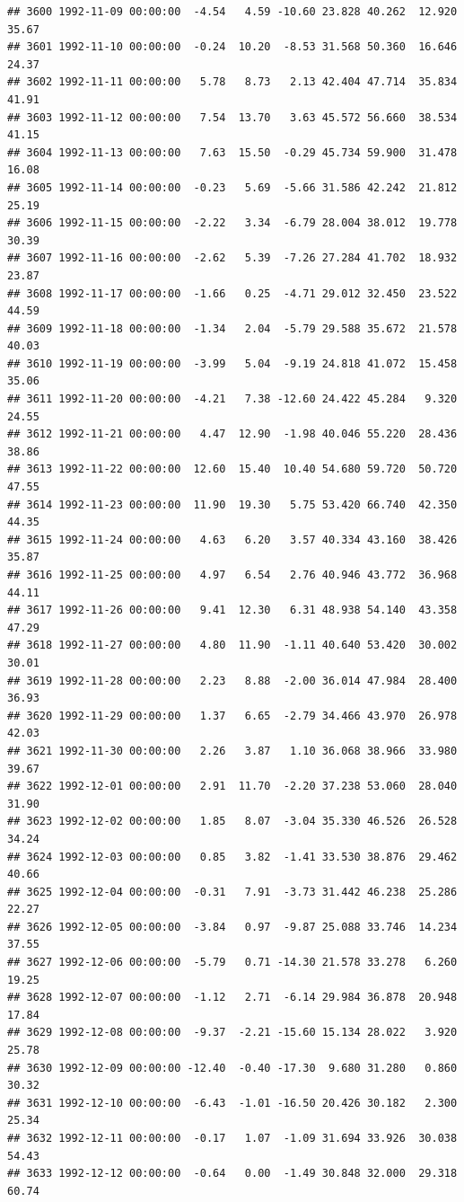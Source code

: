 \documentclass{article}\usepackage{graphicx, color}
\makeatletter
\newenvironment{kframe}{%
 \def\at@end@of@kframe{}%
 \ifinner\ifhmode%
  \def\at@end@of@kframe{\end{minipage}}%
  \begin{minipage}{\columnwidth}%
 \fi\fi%
 \def\FrameCommand##1{\hskip\@totalleftmargin \hskip-\fboxsep
 \colorbox{shadecolor}{##1}\hskip-\fboxsep
     \hskip-\linewidth \hskip-\@totalleftmargin \hskip\columnwidth}%
 \MakeFramed {\advance\hsize-\width
   \@totalleftmargin\z@ \linewidth\hsize
   \@setminipage}}%
 {\par\unskip\endMakeFramed%
 \at@end@of@kframe}
\newenvironment{knitrout}{}{} %
\makeatother
\begin{document}
\begin{knitrout}
\begin{kframe}
\begin{verbatim}
## 3600 1992-11-09 00:00:00  -4.54   4.59 -10.60 23.828 40.262  12.920  35.67
## 3601 1992-11-10 00:00:00  -0.24  10.20  -8.53 31.568 50.360  16.646  24.37
## 3602 1992-11-11 00:00:00   5.78   8.73   2.13 42.404 47.714  35.834  41.91
## 3603 1992-11-12 00:00:00   7.54  13.70   3.63 45.572 56.660  38.534  41.15
## 3604 1992-11-13 00:00:00   7.63  15.50  -0.29 45.734 59.900  31.478  16.08
## 3605 1992-11-14 00:00:00  -0.23   5.69  -5.66 31.586 42.242  21.812  25.19
## 3606 1992-11-15 00:00:00  -2.22   3.34  -6.79 28.004 38.012  19.778  30.39
## 3607 1992-11-16 00:00:00  -2.62   5.39  -7.26 27.284 41.702  18.932  23.87
## 3608 1992-11-17 00:00:00  -1.66   0.25  -4.71 29.012 32.450  23.522  44.59
## 3609 1992-11-18 00:00:00  -1.34   2.04  -5.79 29.588 35.672  21.578  40.03
## 3610 1992-11-19 00:00:00  -3.99   5.04  -9.19 24.818 41.072  15.458  35.06
## 3611 1992-11-20 00:00:00  -4.21   7.38 -12.60 24.422 45.284   9.320  24.55
## 3612 1992-11-21 00:00:00   4.47  12.90  -1.98 40.046 55.220  28.436  38.86
## 3613 1992-11-22 00:00:00  12.60  15.40  10.40 54.680 59.720  50.720  47.55
## 3614 1992-11-23 00:00:00  11.90  19.30   5.75 53.420 66.740  42.350  44.35
## 3615 1992-11-24 00:00:00   4.63   6.20   3.57 40.334 43.160  38.426  35.87
## 3616 1992-11-25 00:00:00   4.97   6.54   2.76 40.946 43.772  36.968  44.11
## 3617 1992-11-26 00:00:00   9.41  12.30   6.31 48.938 54.140  43.358  47.29
## 3618 1992-11-27 00:00:00   4.80  11.90  -1.11 40.640 53.420  30.002  30.01
## 3619 1992-11-28 00:00:00   2.23   8.88  -2.00 36.014 47.984  28.400  36.93
## 3620 1992-11-29 00:00:00   1.37   6.65  -2.79 34.466 43.970  26.978  42.03
## 3621 1992-11-30 00:00:00   2.26   3.87   1.10 36.068 38.966  33.980  39.67
## 3622 1992-12-01 00:00:00   2.91  11.70  -2.20 37.238 53.060  28.040  31.90
## 3623 1992-12-02 00:00:00   1.85   8.07  -3.04 35.330 46.526  26.528  34.24
## 3624 1992-12-03 00:00:00   0.85   3.82  -1.41 33.530 38.876  29.462  40.66
## 3625 1992-12-04 00:00:00  -0.31   7.91  -3.73 31.442 46.238  25.286  22.27
## 3626 1992-12-05 00:00:00  -3.84   0.97  -9.87 25.088 33.746  14.234  37.55
## 3627 1992-12-06 00:00:00  -5.79   0.71 -14.30 21.578 33.278   6.260  19.25
## 3628 1992-12-07 00:00:00  -1.12   2.71  -6.14 29.984 36.878  20.948  17.84
## 3629 1992-12-08 00:00:00  -9.37  -2.21 -15.60 15.134 28.022   3.920  25.78
## 3630 1992-12-09 00:00:00 -12.40  -0.40 -17.30  9.680 31.280   0.860  30.32
## 3631 1992-12-10 00:00:00  -6.43  -1.01 -16.50 20.426 30.182   2.300  25.34
## 3632 1992-12-11 00:00:00  -0.17   1.07  -1.09 31.694 33.926  30.038  54.43
## 3633 1992-12-12 00:00:00  -0.64   0.00  -1.49 30.848 32.000  29.318  60.74

\end{verbatim}
\end{kframe}
\end{knitrout}
\end{document}
